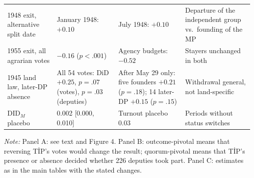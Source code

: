\begin{table}[H]
\begin{threeparttable}
\begin{tabular}{L{3.0cm}L{4.1cm}L{3.1cm}L{4.8cm}}
1948 exit, alternative split date & January 1948: $+0.10$ & July 1948: $+0.10$ & Departure of the independent group vs.\ founding of the MP \\
1955 exit, all agrarian votes & $-0.16$ ($p<.001$) & Agency budgets: $-0.52$ & Stayers unchanged in both \\
1945 land law, later-DP absence & All 54 votes: DiD $+0.25$, $p=.07$ (votes), $p=.03$ (deputies) & After May 29 only: five founders $+0.21$ ($p=.18$); 14 later-DP $+0.15$ ($p=.15$) & Withdrawal general, not land-specific \\
DID$_M$ placebo & 0.002 [0.000, 0.010] & Turnout placebo 0.03 & Periods without status switches \\
\bottomrule
\end{tabular}
\begin{tablenotes}\footnotesize
\item \textit{Note:} Panel A: see text and Figure 4. Panel B: outcome-pivotal means that reversing TİP's votes would change the result; quorum-pivotal means that TİP's presence or absence decided whether 226 deputies took part. Panel C: estimates as in the main tables with the stated changes.
\end{tablenotes}
\end{threeparttable}
\end{table}
